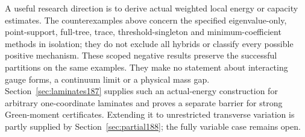 A useful research direction is to derive actual weighted local energy
or capacity estimates. The counterexamples above concern the specified
eigenvalue-only, point-support, full-tree, trace, threshold-singleton and
minimum-coefficient methods in isolation; they do not exclude all hybrids
or classify every possible positive mechanism. These scoped negative results preserve the
successful partitions on the same examples. They make no statement about
interacting gauge forms, a continuum limit or a physical mass gap.
Section~\ref{sec:laminates187} supplies such an actual-energy construction
for arbitrary one-coordinate laminates and proves a separate barrier for
strong Green-moment certificates. Extending it to unrestricted transverse
variation is partly supplied by Section~\ref{sec:partial188}; the fully variable case remains open.
